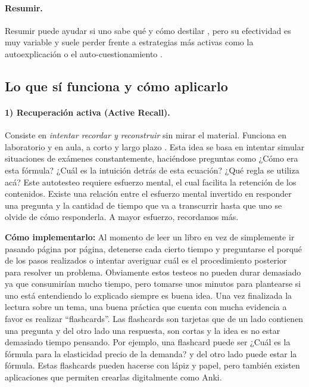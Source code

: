 \documentclass{article}
\begin{document}
\paragraph{\color{teal}Resumir.} Resumir puede ayudar si uno sabe qué y cómo destilar \cite{BretzingKulhavy1979,Rinehart1986}, pero su efectividad es muy variable y suele perder frente a estrategias más activas como la autoexplicación o el auto-cuestionamiento \cite{BednallKehoe2011,King1992,Dunlosky2013}.

\subsection*{Lo que sí funciona y cómo aplicarlo}

\paragraph{\color{teal}1) Recuperación activa (Active Recall).} 
Consiste en \emph{intentar recordar y reconstruir} sin mirar el material. Funciona en laboratorio y en aula, a corto y largo plazo \cite{McDaniel2007,RoedigerButler2011,Larsen2009,Schmidmaier2011,Agarwal2008}. Esta idea se basa en intentar simular situaciones de exámenes constantemente, haciéndose preguntas como ¿Cómo era esta fórmula? ¿Cuál es la intuición detrás de esta ecuación? ¿Qué regla se utiliza acá? Este autotesteo requiere esfuerzo mental, el cual facilita la retención de los contenidos. Existe una relación entre el esfuerzo mental invertido en responder una pregunta y la cantidad de tiempo que va a transcurrir hasta que uno se olvide de cómo responderla. A mayor esfuerzo, recordamos más.
\vspace{3pt}

\textbf{\color{teal}Cómo implementarlo:} Al momento de leer un libro en vez de simplemente ir pasando página por página, detenerse cada cierto tiempo y preguntarse el porqué de los pasos realizados o intentar averiguar cuál es el procedimiento posterior para resolver un problema. Obviamente estos testeos no pueden durar demasiado ya que consumirían mucho tiempo, pero tomarse unos minutos para plantearse si uno está entendiendo lo explicado siempre es buena idea. Una vez finalizada la lectura sobre un tema, una buena práctica que cuenta con mucha evidencia a favor es realizar “flashcards”. Las flashcards son tarjetas que de un lado contienen una pregunta y del otro lado una respuesta, son cortas y la idea es no estar demasiado tiempo pensando. Por ejemplo, una flashcard puede ser ¿Cuál es la fórmula para la elasticidad precio de la demanda? y del otro lado puede estar la fórmula. Estas flashcards pueden hacerse con lápiz y papel, pero también existen aplicaciones que permiten crearlas digitalmente como Anki.
\vspace{3pt}
\end{document}
